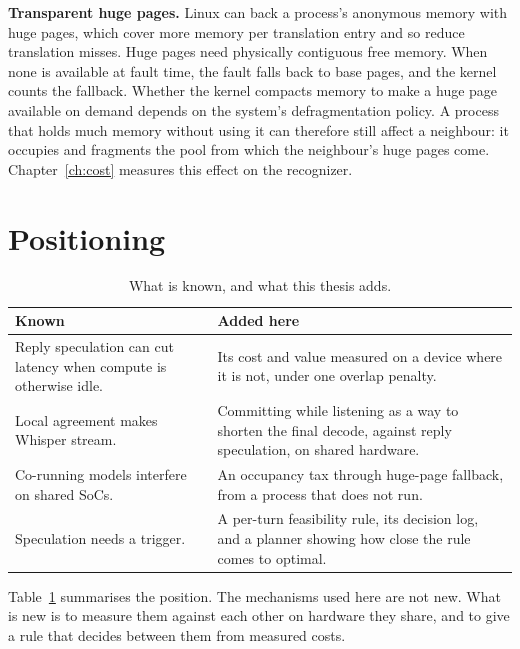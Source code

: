 \textbf{Transparent huge pages.} Linux can back a process's anonymous memory
with huge pages, which cover more memory per translation entry and so reduce
translation misses. Huge pages need physically contiguous free memory. When
none is available at fault time, the fault falls back to base pages, and the
kernel counts the fallback. Whether the kernel compacts memory to make a huge
page available on demand depends on the system's defragmentation policy. A
process that holds much memory without using it can therefore still affect a
neighbour: it occupies and fragments the pool from which the neighbour's huge
pages come. Chapter~\ref{ch:cost} measures this effect on the recognizer.

\section{Positioning}
\label{sec:positioning}

\begin{table}[t]
\centering\small
\caption{What is known, and what this thesis adds.}
\label{tab:positioning}
\begin{tabular}{p{}p{}}
\toprule
Known & Added here \\
\midrule
Reply speculation can cut latency when compute is otherwise idle. &
Its cost and value measured on a device where it is not, under one overlap
penalty. \\
Local agreement makes Whisper stream. &
Committing while listening as a way to shorten the final decode, against
reply speculation, on shared hardware. \\
Co-running models interfere on shared SoCs. &
An occupancy tax through huge-page fallback, from a process that does not
run. \\
Speculation needs a trigger. &
A per-turn feasibility rule, its decision log, and a planner showing how
close the rule comes to optimal. \\
\bottomrule
\end{tabular}
\end{table}

Table~\ref{tab:positioning} summarises the position. The mechanisms used here
are not new. What is new is to measure them against each other on hardware
they share, and to give a rule that decides between them from measured
costs.

